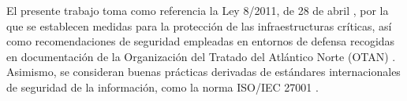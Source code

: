 El presente trabajo toma como referencia la Ley 8/2011, de 28 de abril \cite{ley811}, por la que se establecen medidas para la protección de las infraestructuras críticas, así como recomendaciones de seguridad empleadas en entornos de defensa recogidas en documentación de la Organización del Tratado del Atlántico Norte (OTAN) \cite{stanag4440} \cite{aastp5} \cite{aastp1} . Asimismo, se consideran buenas prácticas derivadas de estándares internacionales de seguridad de la información, como la norma ISO/IEC 27001 \cite{iso27001}.
 

